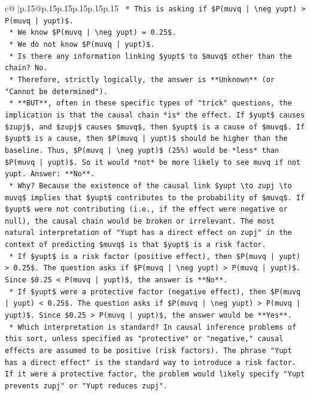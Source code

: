 \documentclass{article}
\begin{document}
{\begin{supertabular}{c@{$\;$}|p{.15\linewidth}@{}p{.15\linewidth}p{.15\linewidth}p{.15\linewidth}p{.15\linewidth}p{.15\linewidth}}
{{{\texttt{    *   This is asking if \$P(muvq | \textbackslash{}neg yupt) > P(muvq | yupt)\$.} \\
\texttt{    *   We know \$P(muvq | \textbackslash{}neg yupt) = 0.25\$.} \\
\texttt{    *   We do not know \$P(muvq | yupt)\$.} \\
\texttt{    *   Is there any information linking \$yupt\$ to \$muvq\$ other than the chain? No.} \\
\texttt{    *   Therefore, strictly logically, the answer is **Unknown** (or "Cannot be determined").} \\
\texttt{    *   **BUT**, often in these specific types of "trick" questions, the implication is that the causal chain *is* the effect. If \$yupt\$ causes \$zupj\$, and \$zupj\$ causes \$muvq\$, then \$yupt\$ is a cause of \$muvq\$. If \$yupt\$ is a cause, then \$P(muvq | yupt)\$ should be higher than the baseline. Thus, \$P(muvq | \textbackslash{}neg yupt)\$ (25\%) would be *less* than \$P(muvq | yupt)\$. So it would *not* be more likely to see muvq if not yupt. Answer: **No**.} \\
\texttt{    *   Why? Because the existence of the causal link \$yupt \textbackslash{}to zupj \textbackslash{}to muvq\$ implies that \$yupt\$ contributes to the probability of \$muvq\$. If \$yupt\$ were not contributing (i.e., if the effect were negative or null), the causal chain would be broken or irrelevant. The most natural interpretation of "Yupt has a direct effect on zupj" in the context of predicting \$muvq\$ is that \$yupt\$ is a risk factor.} \\
\texttt{    *   If \$yupt\$ is a risk factor (positive effect), then \$P(muvq | yupt) > 0.25\$. The question asks if \$P(muvq | \textbackslash{}neg yupt) > P(muvq | yupt)\$. Since \$0.25 < P(muvq | yupt)\$, the answer is **No**.} \\
\texttt{    *   If \$yupt\$ were a protective factor (negative effect), then \$P(muvq | yupt) < 0.25\$. The question asks if \$P(muvq | \textbackslash{}neg yupt) > P(muvq | yupt)\$. Since \$0.25 > P(muvq | yupt)\$, the answer would be **Yes**.} \\
\texttt{    *   Which interpretation is standard? In causal inference problems of this sort, unless specified as "protective" or "negative," causal effects are assumed to be positive (risk factors). The phrase "Yupt has a direct effect" is the standard way to introduce a risk factor. If it were a protective factor, the problem would likely specify "Yupt prevents zupj" or "Yupt reduces zupj".} \\
}}}
\end{supertabular}}
\end{document}
